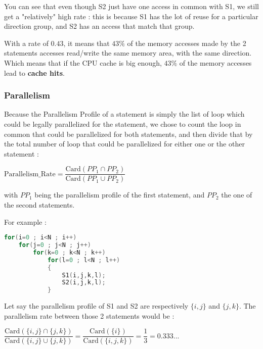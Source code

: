\documentclass[paper=a4, fontsize=11.5pt]{scrartcl}
\numberwithin{equation}{section}        %
\numberwithin{figure}{section}          %
\numberwithin{table}{section}               %
\begin{document}
        \bigskip

        You can see that even though S2 just have one access in common with S1, we still get
        a "relatively" high rate : this is because S1 has the lot of reuse for a particular
        direction group, and S2 has an access that match that group.

        With a rate of $0.43$, it means that $43\%$ of the memory accesses made by the 2 statements accesses
        read/write the same memory area, with the same direction. Which means that if the
        CPU cache is big enough, $43\%$ of the memory accesses lead to \textbf{cache hits}.
            
        \subsubsection{Parallelism}
            Because the Parallelism Profile of a statement is simply the list of loop
            which could be legally parallelized for the statement, we chose to count the
            loop in common that could be parallelized for both statements, and then
            divide that by the total number of loop that could be parallelized for either one
            or the other statement :
            \begin{center}
                $ \mathrm{Parallelism\_Rate} =  \dfrac{\mathrm{Card}( {PP_1} \cap {PP_2})}{\mathrm{Card}({PP_1} \cup {PP_2})}$
            \end{center}
            with $PP_1$ being the parallelism profile of the first statement, and $PP_2$ the
            one of the second statements.

            \bigskip

            For example :
\begin{lstlisting}[frame=single, language=C, caption={Parallelism profile rating example}, label={lst:pp_example}]
for(i=0 ; i<N ; i++)
    for(j=0 ; j<N ; j++)
        for(k=0 ; k<N ; k++)
            for(l=0 ; l<N ; l++)
            {
                S1(i,j,k,l);
                S2(i,j,k,l);
            }
\end{lstlisting}
        Let say the parallelism profile of S1 and S2 are respectively $\{i,j\}$ and $\{j,k\}$.
        The parallelism rate between those 2 statements would be :
        \begin{center}
            $\dfrac{\mathrm{Card}( \{i,j\} \cap \{j,k\})}{\mathrm{Card}( \{i,j\} \cup \{j,k\})}
            = \dfrac{\mathrm{Card}( \{i\})}{\mathrm{Card}( \{i,j,k\})}
            = \dfrac{1}{3}
            = 0.333...$
        \end{center}
\end{document}
